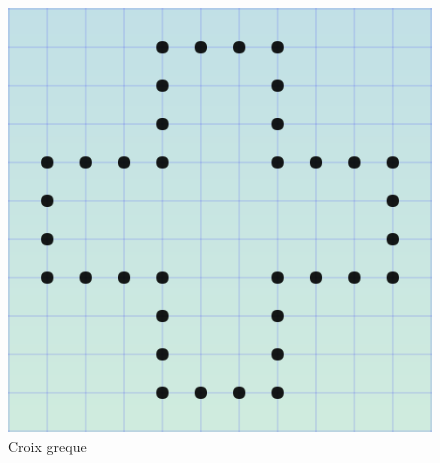 \documentclass[11pt]{article}
\begin{document}
\begin{figure}[htp]
\centering
\includegraphics[scale=1.00]{croix_vide.png}
\caption{Croix greque}

\label{}
\end{figure}
\end{document}

